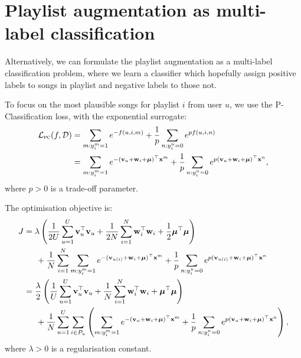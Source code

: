 \section{Playlist augmentation as multi-label classification}

Alternatively, we can formulate the playlist augmentation as a multi-label classification problem,
where we learn a classifier which hopefully assign positive labels to songs in playlist and negative labels to those not.

To focus on the most plausible songs for playlist $i$ from user $u$,
we use the P-Classification loss, with the exponential surrogate:
\begin{equation*}
\begin{aligned}
\mathcal{L}_\textsc{pc}(f, \mathcal{D}) 
&= \sum_{m: y_i^m = 1} e^{-f(u, i, m)} + \frac{1}{p} \sum_{n: y_i^n = 0} e^{p f(u, i, n)} \\
&= \sum_{m: y_i^m = 1} e^{-(\mathbf{v}_u + \mathbf{w}_i + \bm{\mu})^\top \mathbf{x}^m} 
   + \frac{1}{p} \sum_{n: y_i^n = 0} e^{p (\mathbf{v}_u + \mathbf{w}_i + \bm{\mu})^\top \mathbf{x}^n},
\end{aligned}
\end{equation*}
where $p > 0$ is a trade-off parameter.

The optimisation objective is:
\begin{equation*}
\begin{aligned}
J &= \lambda \left( \frac{1}{2 U} \sum_{u=1}^U \mathbf{v}_u^\top \mathbf{v}_u 
     + \frac{1}{2 N} \sum_{i=1}^N \mathbf{w}_i^\top \mathbf{w}_i + \frac{1}{2} \bm{\mu}^\top \bm{\mu} \right) \\
& \hspace{1.5em}
     + \frac{1}{N} \sum_{i=1}^N \sum_{m: y_i^m = 1} e^{-(\mathbf{v}_{u(i)} + \mathbf{w}_i + \bm{\mu})^\top \mathbf{x}^m} 
     + \frac{1}{p} \sum_{n: y_i^n = 0} e^{p (\mathbf{v}_{u(i)} + \mathbf{w}_i + \bm{\mu})^\top \mathbf{x}^n} \\
&= \frac{\lambda}{2} \left( \frac{1}{U} \sum_{u=1}^U \mathbf{v}_u^\top \mathbf{v}_u 
     + \frac{1}{N} \sum_{i=1}^N \mathbf{w}_i^\top \mathbf{w}_i + \bm{\mu}^\top \bm{\mu} \right) \\
& \hspace{1.5em}
     + \frac{1}{N} \sum_{u=1}^U \sum_{i \in P_u} \left(
       \sum_{m: y_i^m = 1} e^{-(\mathbf{v}_{u} + \mathbf{w}_i + \bm{\mu})^\top \mathbf{x}^m} 
       + \frac{1}{p} \sum_{n: y_i^n = 0} e^{p (\mathbf{v}_{u} + \mathbf{w}_i + \bm{\mu})^\top \mathbf{x}^n} \right),
\end{aligned}
\end{equation*}
where $\lambda > 0$ is a regularisation constant.

